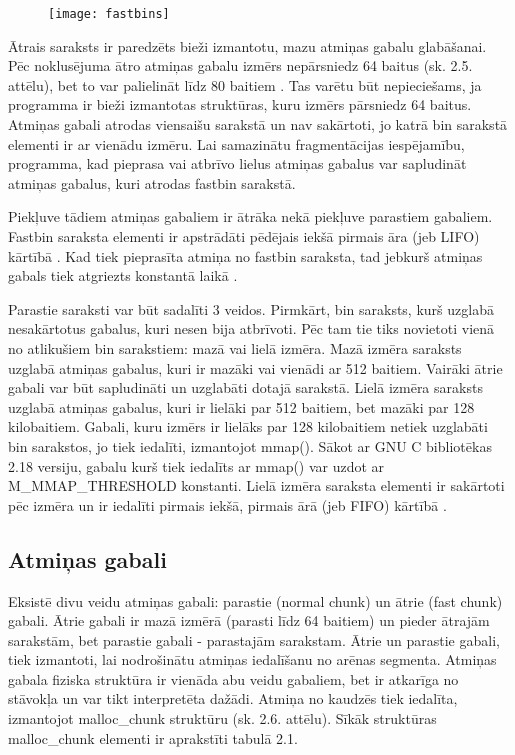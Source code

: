 \begin{figure}[h]
\begin{center}
\texttt{[image: fastbins]}
\end{center}
\caption{\textbf{\fontsize{11}{12}\selectfont {Ātrais saraksts}}}
\label{fig:fastbin}
\end{figure}
Ātrais saraksts ir paredzēts bieži izmantotu, mazu atmiņas gabalu glabāšanai.
Pēc noklusējuma ātro atmiņas gabalu izmērs nepārsniedz 64 baitus (sk. 2.5. attēlu), bet to var palielināt līdz 80 baitiem \cite {MALLOC}. 
Tas varētu būt nepieciešams, ja programma ir bieži izmantotas struktūras, kuru izmērs pārsniedz 64 baitus.
Atmiņas gabali atrodas viensaišu sarakstā un nav sakārtoti, jo katrā bin sarakstā elementi ir ar vienādu izmēru.
Lai samazinātu fragmentācijas iespējamību, programma, kad pieprasa vai atbrīvo lielus atmiņas gabalus var sapludināt atmiņas gabalus, kuri atrodas fastbin sarakstā.

Piekļuve tādiem atmiņas gabaliem ir ātrāka nekā piekļuve parastiem gabaliem. 
Fastbin saraksta elementi ir apstrādāti pēdējais iekšā pirmais āra (jeb LIFO) kārtībā \cite {Binning}.
Kad tiek pieprasīta atmiņa no fastbin saraksta, tad jebkurš atmiņas gabals tiek atgriezts konstantā laikā  \cite {ACCA}.

Parastie saraksti var būt sadalīti 3 veidos. Pirmkārt, bin saraksts, kurš uzglabā nesakārtotus gabalus, kuri nesen bija atbrīvoti.  
Pēc tam tie tiks novietoti vienā no atlikušiem bin sarakstiem: mazā vai lielā izmēra. 
Mazā izmēra saraksts uzglabā atmiņas gabalus, kuri ir mazāki vai vienādi ar 512 baitiem. 
Vairāki ātrie gabali var būt sapludināti un uzglabāti dotajā sarakstā. 
Lielā izmēra saraksts uzglabā atmiņas gabalus, kuri ir lielāki par 512 baitiem, bet mazāki par 128 kilobaitiem. 
Gabali, kuru izmērs ir lielāks par 128 kilobaitiem netiek uzglabāti bin sarakstos, jo tiek iedalīti, izmantojot mmap(). 
Sākot ar GNU C bibliotēkas 2.18 versiju, gabalu kurš tiek iedalīts ar mmap() var uzdot ar M\_MMAP\_THRESHOLD konstanti.
Lielā izmēra saraksta elementi ir sakārtoti pēc izmēra un ir iedalīti pirmais iekšā, pirmais ārā (jeb FIFO) kārtībā \cite {Binning}. 


\subsection{Atmiņas gabali}
\label{subsec:atminas_gabali}


Eksistē divu veidu atmiņas gabali: parastie (normal chunk) un ātrie (fast chunk) gabali. 
Ātrie gabali ir mazā izmērā (parasti līdz 64 baitiem) un pieder ātrajām sarakstām, bet parastie gabali - parastajām sarakstam. 
Ātrie un parastie gabali, tiek izmantoti, lai nodrošinātu atmiņas iedalīšanu no arēnas segmenta.
Atmiņas gabala fiziska struktūra ir vienāda abu veidu gabaliem, bet ir atkarīga no stāvokļa un var tikt interpretēta dažādi.
Atmiņa no kaudzēs tiek iedalīta, izmantojot malloc\_chunk struktūru (sk. 2.6. attēlu). 
Sīkāk struktūras malloc\_chunk elementi ir aprakstīti tabulā 2.1.

